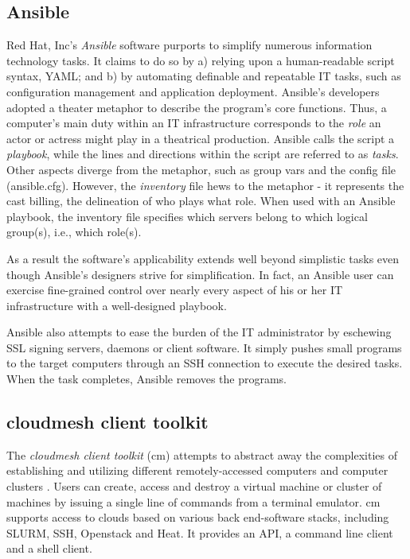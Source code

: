 \documentclass[9pt,twocolumn,twoside]{../../styles/osajnl}
\begin{document}
\subsection{Ansible}
Red Hat, Inc's \cite{www-redhat} \textit{Ansible} software purports to simplify numerous information technology tasks.  It claims to do so by a) relying upon a human-readable script syntax, YAML; and b) by automating definable and repeatable IT tasks, such as configuration management and application deployment.  Ansible's developers adopted a theater metaphor to describe the program's core functions.  Thus, a computer's main duty within an IT infrastructure corresponds to the \textit{role} an actor or actress might play in a theatrical production.  Ansible calls the script a \textit{playbook}, while the lines and directions within the script are referred to as \textit{tasks}.  Other aspects diverge from the metaphor, such as group vars and the config file (ansible.cfg).  However, the \textit{inventory} file hews to the metaphor - it represents the cast billing, the delineation of who plays what role.  When used with an Ansible playbook, the inventory file specifies which servers belong to which logical group(s), i.e., which role(s). 

As a result the software's applicability extends well beyond simplistic tasks even though Ansible's designers strive for simplification.  In fact, an Ansible user can exercise fine-grained control over nearly every aspect of his or her IT infrastructure with a well-designed playbook.  

Ansible also attempts to ease the burden of the IT administrator by eschewing SSL signing servers, daemons or client software.  It simply pushes small programs to the target computers through an SSH connection to execute the desired tasks.  When the task completes, Ansible removes the programs. 

\subsection{cloudmesh client toolkit}
The \textit{cloudmesh client toolkit} (cm) attempts to abstract away the complexities of establishing and utilizing different remotely-accessed computers and computer clusters \cite{www-cm}.  Users can create, access and destroy a virtual machine or cluster of machines by issuing a single line of commands from a terminal emulator.  cm supports access to clouds based on various back end-software stacks, including SLURM, SSH, Openstack and Heat.  It provides an API, a command line client and a shell client.
\end{document}
